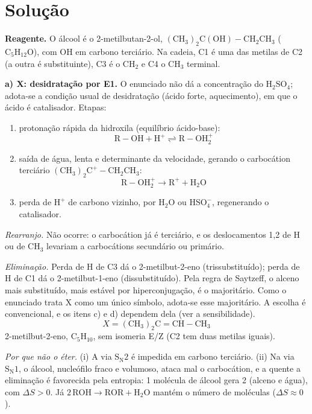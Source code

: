 \documentclass{article}%
\begin{document}
\section*{Solução}

\textbf{Reagente.} O álcool é o 2-metilbutan-2-ol, $(\mathrm{CH_3})_2\mathrm{C(OH){-}CH_2CH_3}$ ($\mathrm{C_5H_{12}O}$), com OH em carbono terciário. Na cadeia, C1 é uma das metilas de C2 (a outra é substituinte), C3 é o $\mathrm{CH_2}$ e C4 o $\mathrm{CH_3}$ terminal.

\textbf{a) X: desidratação por E1.} O enunciado não dá a concentração do $\mathrm{H_2SO_4}$; adota-se a condição usual de desidratação (ácido forte, aquecimento), em que o ácido é catalisador. Etapas:
\begin{enumerate}
\item protonação rápida da hidroxila (equilíbrio ácido-base):
\[ \mathrm{R{-}OH + H^{+} \rightleftharpoons R{-}OH_2^{+}} \]
\item saída de água, lenta e determinante da velocidade, gerando o carbocátion terciário $\mathrm{(CH_3)_2C^{+}{-}CH_2CH_3}$:
\[ \mathrm{R{-}OH_2^{+} \rightarrow R^{+} + H_2O} \]
\item perda de $\mathrm{H^{+}}$ de carbono vizinho, por $\mathrm{H_2O}$ ou $\mathrm{HSO_4^{-}}$, regenerando o catalisador.
\end{enumerate}
\textit{Rearranjo.} Não ocorre: o carbocátion já é terciário, e os deslocamentos 1,2 de H ou de $\mathrm{CH_3}$ levariam a carbocátions secundário ou primário.

\textit{Eliminação.} Perda de H de C3 dá o 2-metilbut-2-eno (trissubstituído); perda de H de C1 dá o 2-metilbut-1-eno (dissubstituído). Pela regra de Saytzeff, o alceno mais substituído, mais estável por hiperconjugação, é o majoritário. Como o enunciado trata X como um único símbolo, adota-se esse majoritário. A escolha é convencional, e os itens c) e d) dependem dela (ver a sensibilidade).
\[ X = (\mathrm{CH_3})_2\mathrm{C{=}CH{-}CH_3} \]
2-metilbut-2-eno, $\mathrm{C_5H_{10}}$, sem isomeria E/Z (C2 tem duas metilas iguais).

\textit{Por que não o éter.} (i) A via $\mathrm{S_N2}$ é impedida em carbono terciário. (ii) Na via $\mathrm{S_N1}$, o álcool, nucleófilo fraco e volumoso, ataca mal o carbocátion, e a quente a eliminação é favorecida pela entropia: 1 molécula de álcool gera 2 (alceno e água), com $\Delta S > 0$. Já $2\,\mathrm{ROH \rightarrow ROR + H_2O}$ mantém o número de moléculas ($\Delta S \approx 0$).
\end{document}
